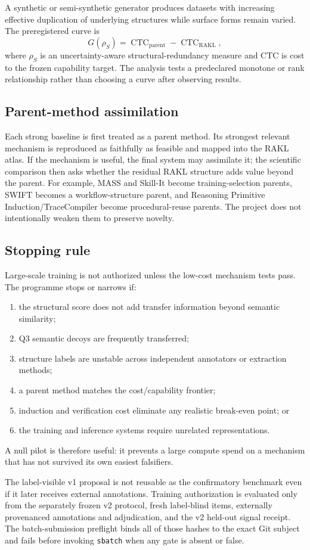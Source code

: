 A synthetic or semi-synthetic generator produces datasets with increasing effective duplication of underlying structures while surface forms remain varied. The preregistered curve is
\[
G(\rho_S)=\operatorname{CTC}_{\mathrm{parent}}-\operatorname{CTC}_{\mathrm{RAKL}},
\]
where $\rho_S$ is an uncertainty-aware structural-redundancy measure and CTC is cost to the frozen capability target. The analysis tests a predeclared monotone or rank relationship rather than choosing a curve after observing results.

\subsection{Parent-method assimilation}

Each strong baseline is first treated as a parent method. Its strongest relevant mechanism is reproduced as faithfully as feasible and mapped into the RAKL atlas. If the mechanism is useful, the final system may assimilate it; the scientific comparison then asks whether the residual RAKL structure adds value beyond the parent. For example, MASS and Skill-It become training-selection parents, SWIFT becomes a workflow-structure parent, and Reasoning Primitive Induction/TraceCompiler become procedural-reuse parents. The project does not intentionally weaken them to preserve novelty.

\subsection{Stopping rule}

Large-scale training is not authorized unless the low-cost mechanism tests pass. The programme stops or narrows if:
\begin{enumerate}[leftmargin=*]
\item the structural score does not add transfer information beyond semantic similarity;
\item Q3 semantic decoys are frequently transferred;
\item structure labels are unstable across independent annotators or extraction methods;
\item a parent method matches the cost/capability frontier;
\item induction and verification cost eliminate any realistic break-even point; or
\item the training and inference systems require unrelated representations.
\end{enumerate}

A null pilot is therefore useful: it prevents a large compute spend on a mechanism that has not survived its own easiest falsifiers.

The label-visible v1 proposal is not reusable as the confirmatory benchmark even
if it later receives external annotations.  Training authorization is evaluated
only from the separately frozen v2 protocol, fresh label-blind items, externally
provenanced annotations and adjudication, and the v2 held-out signal receipt.  The
batch-submission preflight binds all of those hashes to the exact Git subject and
fails before invoking \texttt{sbatch} when any gate is absent or false.
